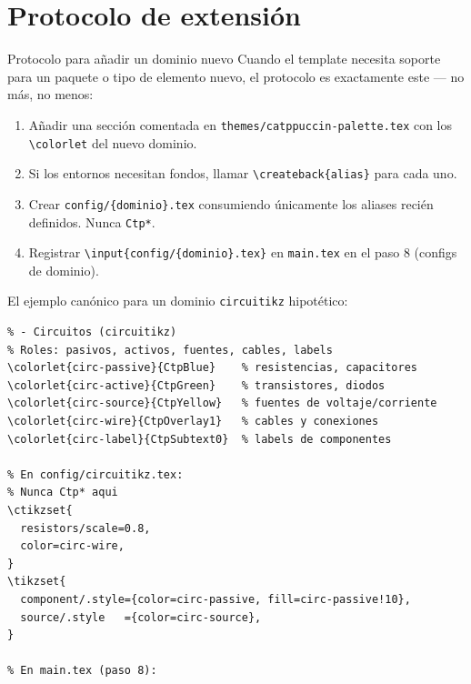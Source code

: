 \section{Protocolo de extensión}
\label{ap:sec:extension}

\begin{definicion}{Protocolo para añadir un dominio nuevo}
\label{ap:def:extension}
Cuando el template necesita soporte para un paquete o tipo de elemento
nuevo, el protocolo es exactamente este — no más, no menos:
\begin{enumerate}[label=\textbf{\arabic*.}, leftmargin=2em]
  \item Añadir una sección comentada en \texttt{themes/catppuccin-palette.tex}
    con los \texttt{\textbackslash colorlet} del nuevo dominio.
  \item Si los entornos necesitan fondos, llamar
    \texttt{\textbackslash createback\{alias\}} para cada uno.
  \item Crear \texttt{config/\{dominio\}.tex} consumiendo únicamente
    los aliases recién definidos. Nunca \texttt{Ctp*}.
  \item Registrar \texttt{\textbackslash input\{config/\{dominio\}.tex\}}
    en \texttt{main.tex} en el paso 8 (configs de dominio).
\end{enumerate}
\end{definicion}

El ejemplo canónico para un dominio \texttt{circuitikz} hipotético:

\begin{lstlisting}[style=latex, frame=none, numbers=none]
% En themes/catppuccin-palette.tex:
% - Circuitos (circuitikz) 
% Roles: pasivos, activos, fuentes, cables, labels
\colorlet{circ-passive}{CtpBlue}    % resistencias, capacitores
\colorlet{circ-active}{CtpGreen}    % transistores, diodos
\colorlet{circ-source}{CtpYellow}   % fuentes de voltaje/corriente
\colorlet{circ-wire}{CtpOverlay1}   % cables y conexiones
\colorlet{circ-label}{CtpSubtext0}  % labels de componentes

% En config/circuitikz.tex:
% Nunca Ctp* aqui
\ctikzset{
  resistors/scale=0.8,
  color=circ-wire,
}
\tikzset{
  component/.style={color=circ-passive, fill=circ-passive!10},
  source/.style   ={color=circ-source},
}

% En main.tex (paso 8):

\end{lstlisting}

